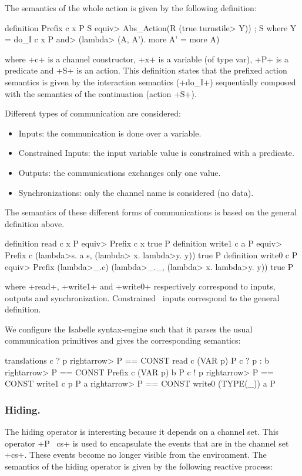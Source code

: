 \documentclass[11pt,a4paper]{article}
\begin{document}
The semantics of the whole action is given by the following definition:
\begin{isar}
definition Prefix c x P S \<equiv>    Abs_Action(R (true \<turnstile>   Y)) ; S
where
Y =  do_I c x P \<and>   (\<lambda> (A, A'). more A' = more A)
\end{isar}
where \inlineisar+c+ is a channel constructor, \inlineisar+x+ is a variable (of type var), \inlineisar+P+ is a predicate and \inlineisar+S+ is an action. This definition states that the prefixed action semantics is given by the interaction semantics (\inlineisar+do_I+) sequentially composed with the semantics of the continuation (action \inlineisar+S+).


Different types of communication are considered: %
\begin{itemize}
\item Inputs: the communication is done over a variable.
\item Constrained Inputs: the input variable value is constrained with a predicate.
\item Outputs: the communications exchanges only one value.
\item Synchronizations: only the channel name is considered (no data).
\end{itemize}

The semantics of these different forms of communications is based on the general definition above.
\begin{isar}
definition read c x P  \<equiv>   Prefix c x true P
definition write1 c a P \<equiv>    Prefix c (\<lambda>s. a s, (\<lambda> x. \<lambda>y. y)) true P
definition write0 c P \<equiv>    Prefix (\<lambda>_.c) (\<lambda>_._, (\<lambda> x. \<lambda>y. y)) true P
\end{isar}
where \inlineisar+read+, \inlineisar+write1+ and \inlineisar+write0+ respectively correspond to inputs, outputs and synchronization. Constrained~ inputs correspond to the general definition.


We configure the Isabelle syntax-engine such that it parses the usual
communication primitives and gives the corresponding semantics:
\begin{isar}
translations
  c ? p \<rightarrow> P      == CONST read c (VAR p) P
  c ? p : b \<rightarrow> P  == CONST Prefix c (VAR p) b P
  c ! p \<rightarrow> P      == CONST write1 c p P
  a \<rightarrow> P          == CONST write0 (TYPE(_)) a P
\end{isar}

\subsubsection{Hiding.}
The hiding operator is interesting because it depends on a channel set. This operator \inlineisar+P \ cs+ is used to encapsulate the events that are in the channel set \inlineisar+cs+. These events become no longer visible from the environment. The semantics of the hiding operator is given by the following reactive process:
\end{document}
